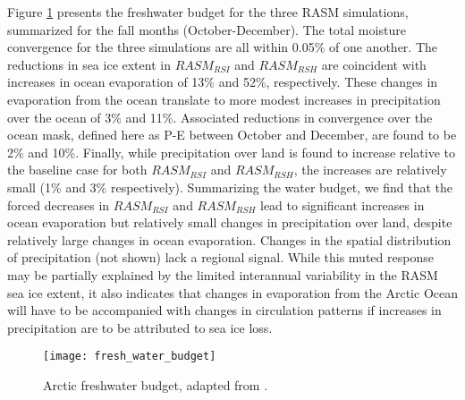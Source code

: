 Figure \ref{fig:fwb} presents the freshwater budget for the three RASM simulations, summarized for the fall months (October-December). %
The total moisture convergence for the three simulations are all within 0.05\% of one another. %
The reductions in sea ice extent in $RASM_{RSI}$ and $RASM_{RSH}$ are coincident with increases in ocean evaporation of 13\% and 52\%, respectively.
These changes in evaporation from the ocean translate to more modest increases in precipitation over the ocean of 3\% and 11\%.
Associated reductions in convergence over the ocean mask, defined here as P-E between October and December, are found to be 2\% and 10\%. %
Finally, while precipitation over land is found to increase relative to the baseline case for both $RASM_{RSI}$ and $RASM_{RSH}$, the increases are relatively small (1\% and 3\% respectively). %
Summarizing the water budget, we find that the forced decreases in $RASM_{RSI}$ and $RASM_{RSH}$ lead to significant increases in ocean evaporation but relatively small changes in precipitation over land, despite relatively large changes in ocean evaporation. %
Changes in the spatial distribution of precipitation (not shown) lack a regional signal. %
While this muted response may be partially explained by the limited interannual variability in the RASM sea ice extent, it also indicates that changes in evaporation from the Arctic Ocean will have to be accompanied with changes in circulation patterns if increases in precipitation are to be attributed to sea ice loss.

\begin{figure}
  \centering
  \texttt{[image: fresh\_water\_budget]}
  \caption{Arctic freshwater budget, adapted from \citet{Serreze_2006a}.}
  \label{fig:fwb} %
\end{figure}

